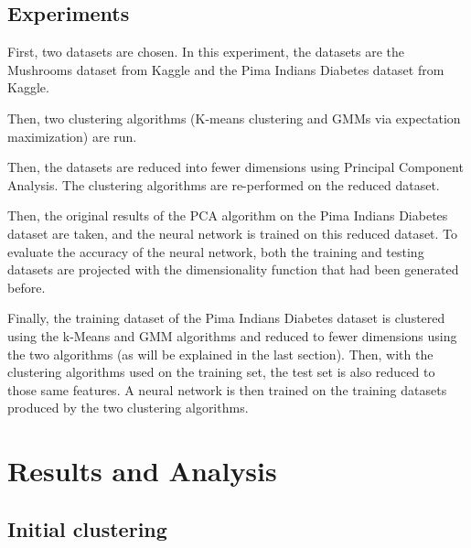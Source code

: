 \documentclass[11pt]{article}
\begin{document}
            \subsection{Experiments}
            
            First, two datasets are chosen. In this experiment, the datasets are the Mushrooms
            dataset from Kaggle and the Pima Indians Diabetes dataset from Kaggle.

            Then, two clustering algorithms (K-means clustering and GMMs via expectation maximization)
            are run.

            Then, the datasets are reduced into fewer dimensions using Principal Component Analysis.
            The clustering algorithms are re-performed on the reduced dataset.

            Then, the original results of the PCA algorithm on the Pima Indians
            Diabetes dataset are taken, and the neural network is trained on this reduced
            dataset. To evaluate the accuracy of the neural network, both the training
            and testing datasets are projected with the dimensionality function that had been generated
            before.


            Finally, the training dataset of the Pima Indians
            Diabetes dataset is clustered using the k-Means and GMM algorithms
            and reduced to fewer dimensions using the two algorithms (as will
            be explained in the last section). 
            Then, with the clustering algorithms used on the training set,
            the test set is also reduced to those same features. A neural network
            is then trained on the training datasets produced by the two clustering
            algorithms.
           
        \section{Results and Analysis}

            \subsection{Initial clustering}


\end{document}
